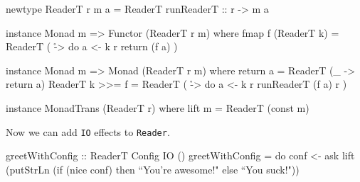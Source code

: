 \documentclass[12pt]{article}
\begin{document}
\begin{haskell}
newtype ReaderT r m a = ReaderT { runReaderT :: r -> m a }

instance Monad m => Functor (ReaderT r m) where
    fmap f (ReaderT k) = ReaderT ( \r -> do
        a <- k r
        return (f a) )

instance Monad m => Monad (ReaderT r m) where
    return a = ReaderT (\_ -> return a)
    ReaderT k >>= f = ReaderT ( \r -> do
        a <- k r
        runReaderT (f a) r )

instance MonadTrans (ReaderT r) where
    lift m = ReaderT (const m)
\end{haskell}

Now we can add \texttt{IO} effects to \texttt{Reader}.

\begin{haskell}
greetWithConfig :: ReaderT Config IO ()
greetWithConfig = do
    conf <- ask
    lift (putStrLn (if (nice conf) then ``You're awesome!" else ``You suck!"))
\end{haskell}
\end{document}
